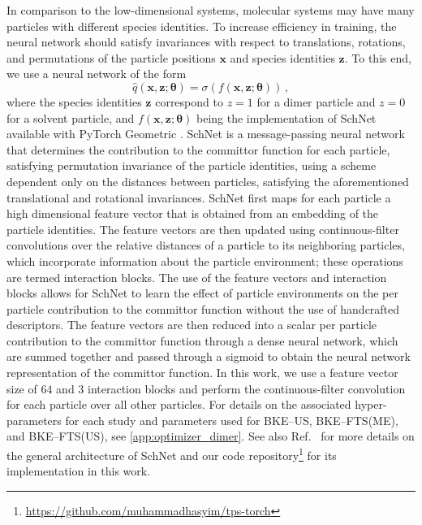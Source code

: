 \documentclass{article}
\numberwithin{equation}{section}
\def\*#1{\mathbf{#1}}
\theoremstyle{definition}
\theoremstyle{remark}
\def\thetab{\boldsymbol{\theta}}
\begin{document}
In comparison to the low-dimensional systems, molecular systems may have many particles with different species identities.
To increase efficiency in training, the neural network should satisfy invariances with respect to translations, rotations, and permutations of the particle positions $ \* x $ and species identities $ \* z $.
To this end, we use a neural network of the form
\begin{equation}
    \hat{q}(\* x, \* z ;\thetab) = \sigma \left( f(\* x, \* z ; \thetab) \right) \,, \label{eq:schnetnn}
\end{equation}
where the species identities $ \* z $ correspond to $ z = 1 $ for a dimer particle and $ z = 0 $ for a solvent particle, and $ f (\* x, \* z ; \thetab) $ being the implementation of SchNet \cite{schutt2018schnet} available with PyTorch Geometric \cite{fey2019pyg}.
SchNet is a message-passing neural network that determines the contribution to the committor function for each particle, satisfying permutation invariance of the particle identities, using a scheme dependent only on the distances between particles, satisfying the aforementioned translational and rotational invariances.
SchNet first maps for each particle a high dimensional feature vector that is obtained from an embedding of the particle identities.
The feature vectors are then updated using continuous-filter convolutions over the relative distances of a particle to its neighboring particles, which incorporate information about the particle environment; these operations are termed interaction blocks.
The use of the feature vectors and interaction blocks allows for SchNet to learn the effect of particle environments on the per particle contribution to the committor function without the use of handcrafted descriptors.
The feature vectors are then reduced into a scalar per particle contribution to the committor function through a dense neural network, which are summed together and passed through a sigmoid to obtain the neural network representation of the committor function.
In this work, we use a feature vector size of $ 64 $ and $ 3 $ interaction blocks and perform the continuous-filter convolution for each particle over all other particles.
For details on the associated hyper-parameters for each study and parameters used for BKE--US, BKE--FTS(ME), and BKE--FTS(US), see \cref{app:optimizer_dimer}. See also Ref.~\cite{schutt2018schnet} for more details on the general architecture of SchNet and our code repository\footnote[2]{\url{  https://github.com/muhammadhasyim/tps-torch}} for its implementation in this work. 
\end{document}
